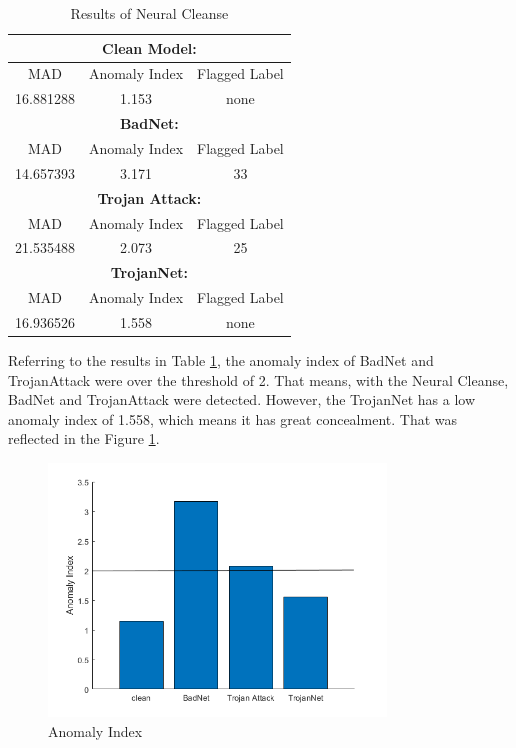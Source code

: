 \documentclass[english,version-2022-01]{uzl-thesis}
\begin{document}
\newpage
    \begin{table}[htbp]
    \centering
    \begin{tabular}{|c|c|c|}
    \hline 
    \multicolumn{3}{|c|}{\textbf{Clean Model:}} \\
    \hline MAD & Anomaly Index & Flagged Label\\
    \hline 16.881288 & 1.153 & none \\
    \hline 
    \multicolumn{3}{|c|}{\textbf{BadNet:}} \\
    \hline MAD & Anomaly Index & Flagged Label\\
    \hline 14.657393 & 3.171 & 33 \\
    \hline 
    \multicolumn{3}{|c|}{\textbf{Trojan Attack:}} \\
    \hline MAD & Anomaly Index & Flagged Label\\
    \hline 21.535488 & 2.073 & 25 \\
    \hline 
    \multicolumn{3}{|c|}{\textbf{TrojanNet:}} \\
    \hline MAD & Anomaly Index & Flagged Label\\
    \hline 16.936526 & 1.558 & none \\
    \hline 
    \end{tabular}
    \caption{Results of Neural Cleanse}
    \label{nc}
    \end{table}
Referring to the results in Table \ref{nc}, the anomaly index of BadNet and TrojanAttack were over the threshold of 2. That means, with the Neural Cleanse, BadNet and TrojanAttack were detected. However, the TrojanNet has a low anomaly index of 1.558, which means it has great concealment. That was reflected in the Figure \ref{detection}.
\begin{figure}[htpb]
  \centering
  \includegraphics[width=0.8\textwidth]{pic/Detection.png}
  \caption{Anomaly Index}
  \label{detection}
\end{figure}
\end{document}
